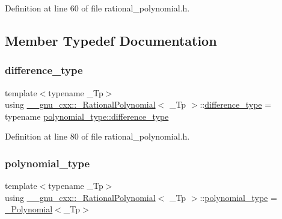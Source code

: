 Definition at line 60 of file rational\+\_\+polynomial.\+h.



\subsection{Member Typedef Documentation}
\mbox{\label{class____gnu__cxx_1_1__RationalPolynomial_aa123f807ebadbf8b3948a77384ce8cb9}} 
\subsubsection{\texorpdfstring{difference\+\_\+type}{difference\_type}}
{\footnotesize\ttfamily template$<$typename \+\_\+\+Tp$>$ \\
using \hyperlink{class____gnu__cxx_1_1__RationalPolynomial}{\+\_\+\+\_\+gnu\+\_\+cxx\+::\+\_\+\+Rational\+Polynomial}$<$ \+\_\+\+Tp $>$\+::\hyperlink{class____gnu__cxx_1_1__RationalPolynomial_aa123f807ebadbf8b3948a77384ce8cb9}{difference\+\_\+type} =  typename \hyperlink{class____gnu__cxx_1_1__Polynomial_aefb6d7ae1935b99a332d5b96b1e82d32}{polynomial\+\_\+type\+::difference\+\_\+type}}



Definition at line 80 of file rational\+\_\+polynomial.\+h.

\mbox{\label{class____gnu__cxx_1_1__RationalPolynomial_a96949c9007664fae9fef1e26cf6c2078}} 
\subsubsection{\texorpdfstring{polynomial\+\_\+type}{polynomial\_type}}
{\footnotesize\ttfamily template$<$typename \+\_\+\+Tp$>$ \\
using \hyperlink{class____gnu__cxx_1_1__RationalPolynomial}{\+\_\+\+\_\+gnu\+\_\+cxx\+::\+\_\+\+Rational\+Polynomial}$<$ \+\_\+\+Tp $>$\+::\hyperlink{class____gnu__cxx_1_1__RationalPolynomial_a96949c9007664fae9fef1e26cf6c2078}{polynomial\+\_\+type} =  \hyperlink{class____gnu__cxx_1_1__Polynomial}{\+\_\+\+Polynomial}$<$\+\_\+\+Tp$>$}

